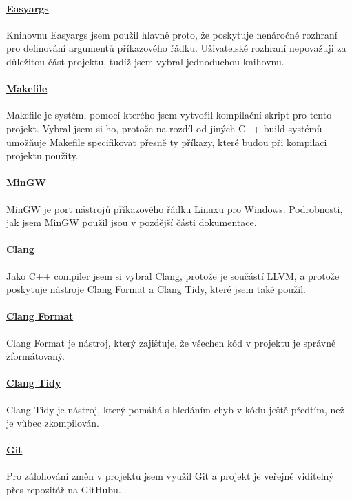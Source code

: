 \documentclass[12pt, a4paper, titlepage, abstract=on]{scrreprt}
\begin{document}
\paragraph{\href{https://github.com/gouwsxander/easy-args}{Easyargs}}
Knihovnu Easyargs jsem použil hlavně proto, že poskytuje nenáročné rozhraní pro definování argumentů příkazového řádku. Uživatelské rozhraní nepovažuji
za důležitou část projektu, tudíž jsem vybral jednoduchou knihovnu.
\paragraph{\href{https://www.gnu.org/software/make/manual/make.html}{Makefile}}
Makefile je systém, pomocí kterého jsem vytvořil kompilační skript pro tento projekt. Vybral jsem si ho, protože na rozdíl od jiných C++ build systémů
umožňuje Makefile specifikovat přesně ty příkazy, které budou při kompilaci projektu použity.
\paragraph{\href{https://www.mingw-w64.org/}{MinGW}}
MinGW je port nástrojů příkazového řádku Linuxu pro Windows. Podrobnosti, jak jsem MinGW použil jsou v pozdější části dokumentace.
\paragraph{\href{https://clang.llvm.org/}{Clang}}
Jako C++ compiler jsem si vybral Clang, protože je součástí LLVM, a protože poskytuje nástroje Clang Format a Clang Tidy, které jsem také použil.
\paragraph{\href{https://clang.llvm.org/docs/ClangFormat.html}{Clang Format}}
Clang Format je nástroj, který zajišťuje, že všechen kód v projektu je správně zformátovaný.
\paragraph{\href{https://clang.llvm.org/extra/clang-tidy/}{Clang Tidy}}
Clang Tidy je nástroj, který pomáhá s hledáním chyb v kódu ještě předtím, než je vůbec zkompilován.
\paragraph{\href{https://git-scm.com/}{Git}}
Pro zálohování změn v projektu jsem využil Git a projekt je veřejně viditelný přes repozitář na GitHubu. \cite{lang_repo}
\end{document}

